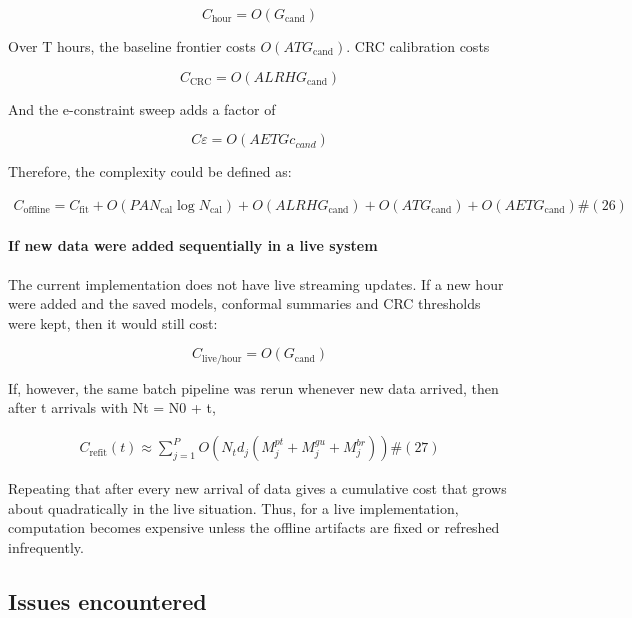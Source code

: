 \documentclass[11pt]{article}
\begin{document}
\[C_{\text{hour}} = O\left( G_{\text{cand}} \right)\]

Over T hours, the baseline frontier costs
\(O\left( ATG_{\text{cand}} \right)\). CRC calibration costs

\[C_{\text{CRC}} = O\left( ALRHG_{\text{cand}} \right)\]

And the e-constraint sweep adds a factor of

\[C\varepsilon = O\left( AETGc_{cand} \right)\]

Therefore, the complexity could be defined as:

\[\begin{array}{r}
C_{\text{offline}} = C_{\text{fit}} + O\left( PAN_{\text{cal}}\log N_{\text{cal}} \right) + O\left( ALRHG_{\text{cand}} \right) + O\left( ATG_{\text{cand}} \right) + O\left( AETG_{\text{cand}} \right)\#(26)
\end{array}\]

\paragraph{If new data were added sequentially in a live
system}\label{if-new-data-were-added-sequentially-in-a-live-system}

The current implementation does not have live streaming updates. If a
new hour were added and the saved models, conformal summaries and CRC
thresholds were kept, then it would still cost:

\[C_{\text{live/hour}} = O\left( G_{\text{cand}} \right)\]

If, however, the same batch pipeline was rerun whenever new data
arrived, then after t arrivals with Nt = N0 + t,

\[\begin{array}{r}
C_{\text{refit}}(t) \approx \sum_{j = 1}^{P}{O\left( N_{t}d_{j}\left( M_{j}^{pt} + M_{j}^{gu} + M_{j}^{br} \right) \right)}\#(27)
\end{array}\]

Repeating that after every new arrival of data gives a cumulative cost
that grows about quadratically in the live situation. Thus, for a live
implementation, computation becomes expensive unless the offline
artifacts are fixed or refreshed infrequently.

\subsection{\texorpdfstring{Issues encountered
}{Issues encountered }}\label{issues-encountered}
\end{document}

